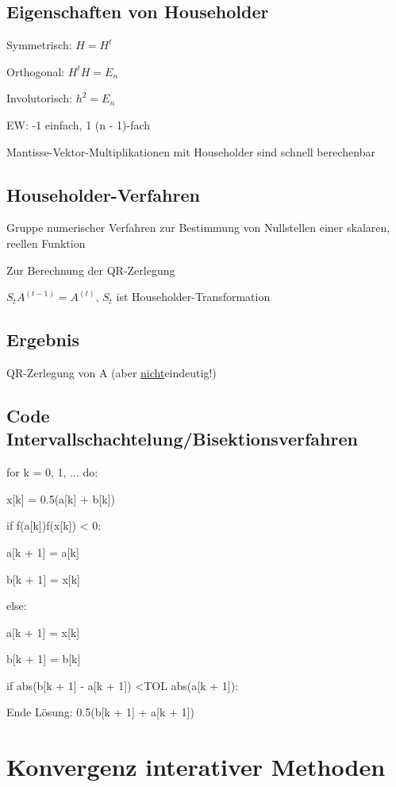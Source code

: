 \documentclass[12pt,a4paper]{article} %
\newcommand*\tab[1][1cm]{\hspace*{#1}}
\begin{document}
	\subsection{Eigenschaften von Householder}
	
	Symmetrisch: $H = H^t$
	
	Orthogonal: $H^tH = E_n$
	
	Involutorisch: $h^2 = E_n$
	
	EW: -1 einfach, 1 (n - 1)-fach
	
	Mantisse-Vektor-Multiplikationen mit Householder sind schnell berechenbar
	
	\subsection{Householder-Verfahren}
	
	Gruppe numerischer Verfahren zur Bestimmung von Nullstellen einer skalaren, reellen Funktion
	
	Zur Berechnung der QR-Zerlegung
	
	$S_tA^{(t - 1)} = A^{(t)}$, $S_t$ ist Householder-Transformation
	
	\subsection{Ergebnis}
	
	QR-Zerlegung von A (aber \underline{nicht}eindeutig!)
	
	\subsection{Code Intervallschachtelung/Bisektionsverfahren}
	
	for k = 0, 1, ... do:
	
	\tab x[k] = 0.5(a[k] + b[k])
	
	\tab if f(a[k])f(x[k]) < 0:
	
	\tab \tab a[k + 1] = a[k]
	
	\tab \tab b[k + 1] = x[k]
	
	\tab else:
	
	\tab \tab a[k + 1] = x[k]
	
	\tab \tab b[k + 1] = b[k]
	
	\tab if abs(b[k + 1] - a[k + 1]) \textless TOL abs(a[k + 1]):
	
	\tab \tab Ende Lösung: 0.5(b[k + 1] + a[k + 1])
	
	\section{Konvergenz interativer Methoden}
	
\end{document}
